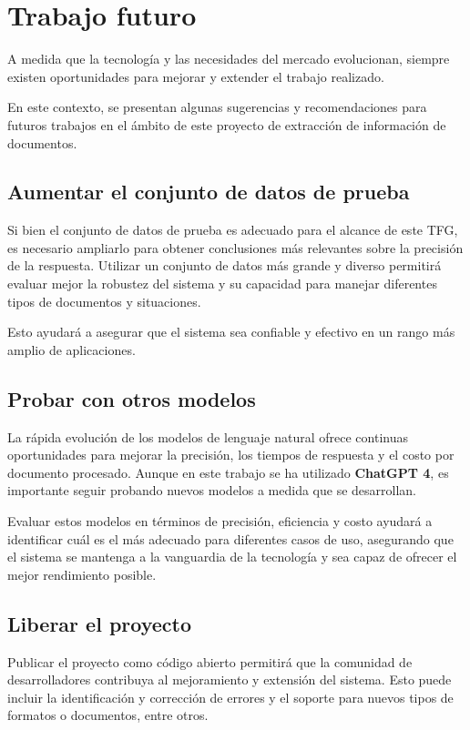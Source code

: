 \section{Trabajo futuro}

A medida que la tecnología y las necesidades del mercado evolucionan, siempre existen oportunidades para mejorar y
extender el trabajo realizado.

En este contexto, se presentan algunas sugerencias y recomendaciones para futuros trabajos en el ámbito de este proyecto
de extracción de información de documentos.

\subsection{Aumentar el conjunto de datos de prueba}

Si bien el conjunto de datos de prueba es adecuado para el alcance de este TFG, es necesario ampliarlo para obtener
conclusiones más relevantes sobre la precisión de la respuesta.
Utilizar un conjunto de datos más grande y diverso permitirá evaluar mejor la robustez del sistema y su capacidad para
manejar diferentes tipos de documentos y situaciones.

Esto ayudará a asegurar que el sistema sea confiable y efectivo en un rango más amplio de aplicaciones.

\subsection{Probar con otros modelos}

La rápida evolución de los modelos de lenguaje natural ofrece continuas oportunidades para mejorar la precisión, los
tiempos de respuesta y el costo por documento procesado.
Aunque en este trabajo se ha utilizado \textbf{ChatGPT 4}, es importante seguir probando nuevos modelos a medida que se
desarrollan.

Evaluar estos modelos en términos de precisión, eficiencia y costo ayudará a identificar cuál es el más adecuado para
diferentes casos de uso, asegurando que el sistema se mantenga a la vanguardia de la tecnología y sea capaz de ofrecer
el mejor rendimiento posible.


\subsection{Liberar el proyecto}

Publicar el proyecto como código abierto permitirá que la comunidad de desarrolladores contribuya al mejoramiento y
extensión del sistema.
Esto puede incluir la identificación y corrección de errores y el soporte para nuevos tipos de formatos o documentos,
entre otros.

